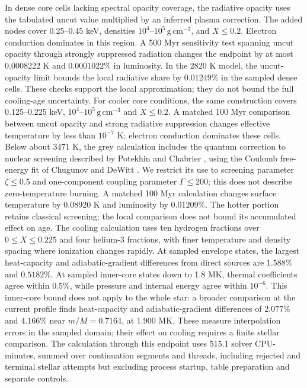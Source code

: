 \documentclass[11pt,letterpaper]{article}
\begin{document}
In dense core cells lacking spectral opacity coverage, the radiative opacity
uses the tabulated uncut value multiplied by an inferred plasma correction.
The added nodes cover 0.25--0.45 keV, densities
$10^4$--$10^5\,\mathrm{g\,cm^{-3}}$, and $X\leq0.2$.
Electron conduction dominates in this region. A 500 Myr sensitivity test
spanning uncut opacity through strongly suppressed radiation changes the
endpoint by at most 0.0008222 K and $0.0001022\%$ in luminosity.
In the 2820 K model, the uncut-opacity limit bounds the local radiative
share by $0.01249\%$ in the sampled dense cells. These checks support the
local approximation; they do not bound the full cooling-age uncertainty.
For cooler core conditions, the same construction covers 0.125--0.225 keV,
$10^4$--$10^5\,\mathrm{g\,cm^{-3}}$ and $X\leq0.2$.
A matched 100 Myr comparison between uncut opacity and strong radiative
suppression changes effective temperature by less than $10^{-7}$ K;
electron conduction dominates these cells.
Below about 3471 K, the grey calculation includes the quantum correction
to nuclear screening described by Potekhin and Chabrier
\cite{potekhin12}, using the Coulomb free-energy fit of Chugunov and
DeWitt \cite{chugunov09}. We restrict its use to screening parameter
$\zeta\leq0.5$ and one-component coupling parameter $\Gamma\leq200$;
this does not describe zero-temperature burning. A matched 100 Myr
calculation changes surface temperature by 0.08920 K and luminosity
by $0.01209\%$. The hotter portion retains classical screening;
the local comparison does not bound its accumulated effect on age.
The cooling calculation uses ten hydrogen fractions over $0\leq X\leq0.225$
and four helium-3 fractions, with finer temperature and density spacing where
ionization changes rapidly. At sampled envelope states, the largest
heat-capacity and adiabatic-gradient differences from direct sources are
$1.588\%$ and $0.5182\%$. At sampled inner-core states down to 1.8 MK,
thermal coefficients agree within $0.5\%$, while pressure and internal energy
agree within $10^{-6}$. This inner-core bound does not apply to the whole
star: a broader comparison at the current profile finds heat-capacity and
adiabatic-gradient differences of $2.077\%$ and $4.166\%$ near
$m/M=0.7164$, at 1.900 MK. These measure interpolation errors in the
sampled domain; their effect on cooling requires a finite stellar comparison.
The calculation through this endpoint uses 515.1 solver CPU-minutes,
summed over continuation segments and threads, including rejected
and terminal stellar attempts but excluding process startup, table preparation and separate controls.
\end{document}
